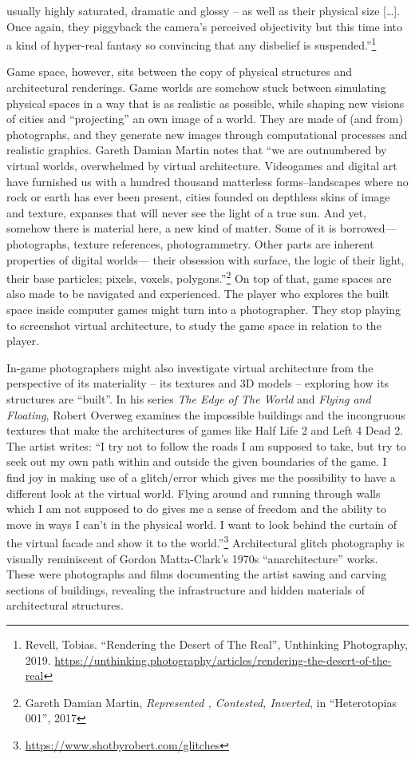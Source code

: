 \documentclass[
  openany]{book}
\begin{document}
usually highly saturated, dramatic and glossy -- as well as their physical size {[}\ldots{]}. Once again, they piggyback the camera's perceived objectivity but this time into a kind of hyper-real fantasy so convincing that any disbelief is suspended.''\footnote{Revell, Tobias. ``Rendering the Desert of The Real'', Unthinking Photography, 2019. \url{https://unthinking.photography/articles/rendering-the-desert-of-the-real}}

Game space, however, sits between the copy of physical structures and architectural renderings. Game worlds are somehow stuck between simulating physical spaces in a way that is as realistic as possible, while shaping new visions of cities and ``projecting'' an own image of a world. They are made of (and from) photographs, and they generate new images through computational processes and realistic graphics. Gareth Damian Martin notes that ``we are outnumbered by virtual worlds, overwhelmed by virtual architecture. Videogames and digital art have furnished us with a hundred thousand matterless forms--landscapes where no rock or earth has ever been present, cities founded on depthless skins of image and texture, expanses that will never see the light of a true sun. And yet, somehow there is material here, a new kind of matter. Some of it is borrowed---photographs, texture references, photogrammetry. Other parts are inherent properties of digital worlds--- their obsession with surface, the logic of their light, their base particles; pixels, voxels, polygons.''\footnote{Gareth Damian Martin, \emph{Represented , Contested, Inverted}, in ``Heterotopias 001'', 2017} On top of that, game spaces are also made to be navigated and experienced. The player who explores the built space inside computer games might turn into a photographer. They stop playing to screenshot virtual architecture, to study the game space in relation to the player.

In-game photographers might also investigate virtual architecture from the perspective of its materiality -- its textures and 3D models -- exploring how its structures are ``built''. In his series \emph{The Edge of The World} and \emph{Flying and Floating}, Robert Overweg examines the impossible buildings and the incongruous textures that make the architectures of games like Half Life 2 and Left 4 Dead 2. The artist writes: ``I try not to follow the roads I am supposed to take, but try to seek out my own path within and outside the given boundaries of the game. I find joy in making use of a glitch/error which gives me the possibility to have a different look at the virtual world. Flying around and running through walls which I am not supposed to do gives me a sense of freedom and the ability to move in ways I can't in the physical world. I want to look behind the curtain of the virtual facade and show it to the world.''\footnote{\url{https://www.shotbyrobert.com/glitches}} Architectural glitch photography is visually reminiscent of Gordon Matta-Clark's 1970s ``anarchitecture'' works. These were photographs and films documenting the artist sawing and carving sections of buildings, revealing the infrastructure and hidden materials of architectural structures.
\end{document}
